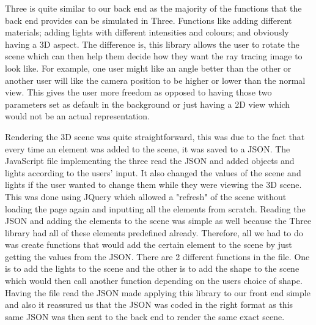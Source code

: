 \documentclass[a4paper]{report}
\begin{document}
	\par Three is quite similar to our back end as the majority of the functions that the back end provides can be simulated in Three. Functions like adding different materials; adding lights with different intensities and colours; and obviously having a 3D aspect. The difference is, this library allows the user to rotate the scene which can then help them decide how they want the ray tracing image to look like. For example, one user might like an angle better than the other or another user will like the camera position to be higher or lower than the normal view. This gives the user more freedom as opposed to having those two parameters set as default in the background or just having a 2D view which would not be an actual representation.\newline 
	
	\par Rendering the 3D scene was quite straightforward, this was due to the fact that every time an element was added to the scene, it was saved to a JSON. The JavaScript file implementing the three read the JSON and added objects and lights according to the users' input. It also changed the values of the scene and lights if the user wanted to change them while they were viewing the 3D scene. This was done using JQuery which allowed a "refresh" of the scene without loading the page again and inputting all the elements from scratch. Reading the JSON and adding the elements to the scene was simple as well because the Three library had all of these elements predefined already. Therefore, all we had to do was create functions that would add the certain element to the scene by just getting the values from the JSON. There are 2 different functions in the file. One is to add the lights to the scene and the other is to add the shape to the scene which would then call another function depending on the users choice of shape. Having the file read the JSON made applying this library to our front end simple and also it reassured us that the JSON was coded in the right format as this same JSON was then sent to the back end to render the same exact scene.
	
\end{document}
